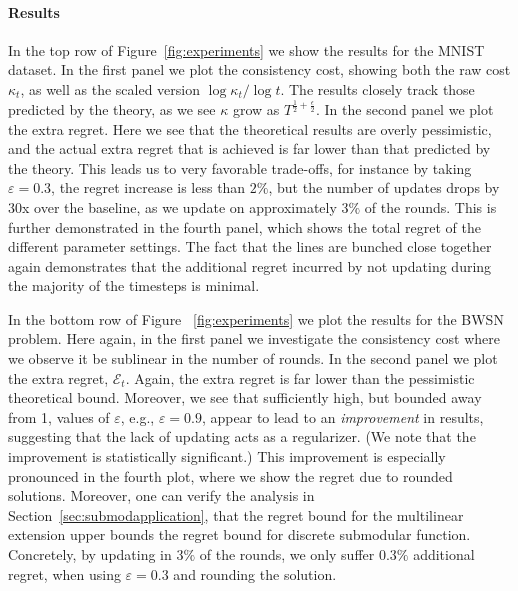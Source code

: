 \paragraph{Results}
In the top row of Figure~\ref{fig:experiments} we show the results for the MNIST dataset. In the first panel we plot the consistency cost, showing both the raw cost $\kappa_t$, as well as the scaled version $\log \kappa_t / \log t$. The results closely track those predicted by the theory, as we see $\kappa$ grow as $T^{\frac{1}{2} + \frac{\epsilon}{2}}$. In the second panel we plot the extra regret. Here we see that the theoretical results are overly pessimistic, and the actual extra regret that is achieved is far lower than that predicted by the theory. This leads us to very favorable trade-offs, for instance by taking $\varepsilon=0.3$, the regret increase is less than $2\%$, but the number of updates drops by $30$x over the baseline, as we update on approximately $3\%$ of the rounds. This is further demonstrated in the fourth panel, which shows the total regret of the different parameter settings. The fact that the lines are bunched close together again demonstrates that the additional regret incurred by not updating during the majority of the timesteps is minimal. 

In the bottom row of Figure ~\ref{fig:experiments} we plot the results for the BWSN problem. Here again, in the first panel we investigate the consistency cost where we observe it be sublinear in the number of rounds. In the second panel we plot the extra regret, $\mathcal{E}_t$. Again, the extra regret is far lower than the pessimistic theoretical bound. Moreover, we see that sufficiently high, but bounded away from 1, values of $\varepsilon$, e.g.,  $\varepsilon = 0.9$, appear to lead to an {\em improvement} in results, suggesting that the lack of updating acts as a regularizer. (We note that the improvement is statistically significant.) This improvement is especially pronounced in the fourth plot, where we show the regret due to rounded solutions. Moreover, one can verify the analysis in Section~\ref{sec:submodapplication}, that the regret bound for the multilinear extension upper bounds the regret bound for discrete submodular function. Concretely, by updating in $3\%$ of the rounds, we only suffer $0.3\%$ additional regret, when using $\varepsilon = 0.3$ and rounding the solution.


